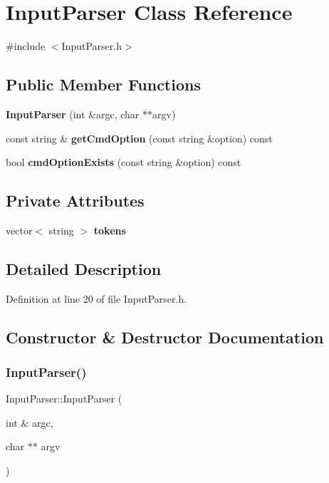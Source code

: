 \section{Input\+Parser Class Reference}
\label{class_input_parser}


{\ttfamily \#include $<$Input\+Parser.\+h$>$}

\subsection*{Public Member Functions}
\begin{DoxyCompactItemize}
\item 
\textbf{ Input\+Parser} (int \&argc, char $\ast$$\ast$argv)
\item 
const string \& \textbf{ get\+Cmd\+Option} (const string \&option) const
\item 
bool \textbf{ cmd\+Option\+Exists} (const string \&option) const
\end{DoxyCompactItemize}
\subsection*{Private Attributes}
\begin{DoxyCompactItemize}
\item 
vector$<$ string $>$ \textbf{ tokens}
\end{DoxyCompactItemize}


\subsection{Detailed Description}


Definition at line 20 of file Input\+Parser.\+h.



\subsection{Constructor \& Destructor Documentation}
\mbox{\label{class_input_parser_af9fa5ead1f28b5294a713410df5b9531}} 
\subsubsection{Input\+Parser()}
{\footnotesize\ttfamily Input\+Parser\+::\+Input\+Parser (\begin{DoxyParamCaption}\item[{int \&}]{argc,  }\item[{char $\ast$$\ast$}]{argv }\end{DoxyParamCaption})}



